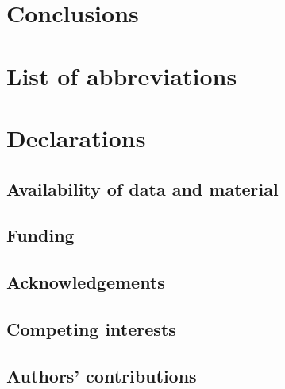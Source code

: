 \documentclass[
  super,
  preprint,
  3p]{elsarticle}
\begin{document}
\hypertarget{conclusions}{%
\section{Conclusions}\label{conclusions}}

\hypertarget{list-of-abbreviations}{%
\section{List of abbreviations}\label{list-of-abbreviations}}

\hypertarget{declarations}{%
\section{Declarations}\label{declarations}}

\hypertarget{availability-of-data-and-material}{%
\subsection*{Availability of data and
material}\label{availability-of-data-and-material}}

\hypertarget{funding}{%
\subsection*{Funding}\label{funding}}

\hypertarget{acknowledgements}{%
\subsection*{Acknowledgements}\label{acknowledgements}}

\hypertarget{competing-interests}{%
\subsection*{Competing interests}\label{competing-interests}}

\hypertarget{authors-contributions}{%
\subsection*{Authors' contributions}\label{authors-contributions}}


  
\end{document}
